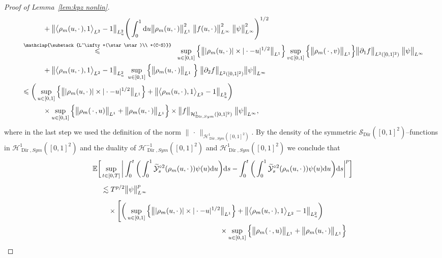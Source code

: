 \documentclass[10pt]{amsart}
\theoremstyle{definition}\newtheorem{defi}[theo]{Definition}\newtheorem{rema}[theo]{Remark}\newtheorem{exam}[theo]{Example}\newtheorem{exem}[theo]{Example}\newtheorem{nota}[theo]{Notation}
\DeclareMathOperator{\Dir}{Dir}
\newcommand{\mc}[1]{{\mathcal #1}}
\renewcommand{\mc}[1]{{\mathcal #1}}
\newcommand{\SD}{\ensuremath{\mc S_{\Dir}}}
\renewcommand{\leq}{\leqslant}
\newcommand*{\dd}{\mathrm{d}}
\newcommand*{\ds}{\dd s}
\newcommand*{\du}{\dd u}
\begin{document}
\begin{proof}[Proof of Lemma~\ref{lem:kpz nonlin}]
\begin{align*}
&\qquad \quad + \big\| \big\langle \rho_m (u, \cdot\,), 1 \big\rangle_{L^2} - 1 \big\|_{L^2_u} \Bigg(\int_0^1 \du\big\| \rho_m (u, \cdot\,) \big\|_{L^1}^2 \; \big\| f (u, \cdot\,)\big\|_{L^{\infty}}^2 \; \big\| \psi \big\|_{L^{\infty}}^2 \Bigg)^{1/2}\\
&\overset{\mathclap{\substack{L^\infty+(\star\star)\\ +(C-S)}}}{\leq}\;\; \sup_{u\in[0,1]} \Big\{ \big\| | \rho_m (u, \cdot\,) | \times | \cdot - u |^{1/2}\big\|_{L^1} \Big\} \sup_{v\in[0,1]} \Big\{\big\| \rho_m (\,\cdot\,, v) \big\|_{L^1} \Big\} \big\| \partial_1 f \big\|_{L^2([0,1]^2)}\; \big\| \psi \big\|_{L^{\infty}}\\*
&\qquad\quad+ \big\| \big\langle \rho_m (u, \cdot\,), 1 \big\rangle_{L^2} - 1 \big\|_{L^2_u} \; \sup_{u\in[0,1]} \Big\{ \big\|\rho_m (u, \cdot\,) \big\|_{L^1} \; \Big\}\; \big\| \partial_2 f \big\|_{L^2([0,1]^2)} \big\| \psi\big\|_{L^{\infty}}\\
&\leq \bigg(\sup_{u\in[0,1]} \Big\{ \big\| | \rho_m (u, \cdot\,) | \times | \cdot - u |^{1/2}\big\|_{L^1} \Big\} + \big\| \big\langle \rho_m (u, \cdot\,), 1 \big\rangle_{L^2} - 1 \big\|_{L^2_u} \bigg)\\*
&\qquad\quad\times \sup_{u\in[0,1]} \Big\{ \big\| \rho_m (\,\cdot\,, u) \big\|_{L^1} + \big\| \rho_m (u, \cdot\,)\big\|_{L^1} \Big\} \times \big\| f \big\|_{\mc H_{\Dir,Sym}^1([0, 1]^2)} \; \big\| \psi \big\|_{L^{\infty}},
\end{align*}
\endgroup
where in the last step we used the definition of the norm $\|{\,\cdot\,}\|_{\mc H_{\Dir,Sym}^1([0, 1]^2)}$. By the density of the symmetric $\SD ([0, 1]^2)$--functions in $\mc H_{\Dir, Sym}^1 ([0, 1]^2)$ and the duality of $\mc H_{\Dir, Sym}^{-1} ([0, 1]^2)$ and $\mc H_{\Dir, Sym}^1 ([0, 1]^2)$ we conclude that
\begin{align*}
\mathbb{E} \bigg[&\sup_{t \in[0,T]} \bigg| \int_0^t \bigg(\int_0^1\widetilde{\mc Y}^{\diamond 2}_s (\rho_m (u, \cdot\,)) \psi (u) \du \bigg) \ds - \int_0^t \bigg(\int_0^1 \widetilde{\mc Y}^{\diamond 2}_s (\rho_n (u, \cdot\,)) \psi (u) \du \bigg) \ds \bigg|^p \bigg]\\
&\lesssim T^{p / 2} \big\| \psi \big\|^p_{L^{\infty}} \vphantom{\int} \\
& \quad \times \Bigg[\bigg(\sup_{u\in[0,1]} \Big\{ \big\| | \rho_m (u, \cdot\,) | \times | \cdot - u |^{1/2}\big\|_{L^1} \Big\} + \big\| \big\langle \rho_m (u, \cdot\,), 1 \big\rangle_{L^2} - 1 \big\|_{L^2_u} \bigg)\\
&\mkern 300mu \times \sup_{u\in[0,1]} \Big\{ \big\| \rho_m (\,\cdot\,, u) \big\|_{L^1} + \big\| \rho_m (u, \cdot\,)\big\|_{L^1} \Big\}\\

\end{align*}
\end{proof}
\end{document}
